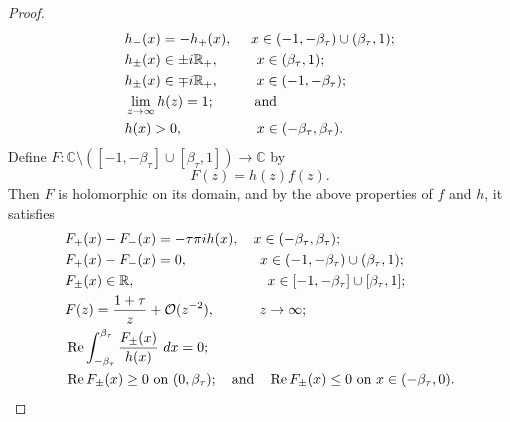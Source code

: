 \documentclass[reqno,11pt]{amsart}
\theoremstyle{plain}
\theoremstyle{definition}
\theoremstyle{remark}
\numberwithin{equation}{section}
\begin{document}
\begin{proof}
    \begin{align}
        &h_-(x)=-h_+(x),\quad\ x\in(-1,-\beta_\tau)\cup(\beta_\tau,1);\nonumber\\
        &h_\pm(x)\in \pm i\mathbb{R}_{+},\hspace{0.95cm} x\in(\beta_\tau,1);\nonumber\\
        &h_\pm(x)\in \mp i\mathbb{R}_{+},\hspace{0.95cm}  x\in(-1,-\beta_\tau);\nonumber\\
        &\lim_{z\to \infty}h(z)=1;\hspace{0.65cm}\quad \text{and}\nonumber\\
        &h(x)>0,\hspace{1.86cm} x\in(-\beta_\tau,\beta_\tau).\label{h_positive_on_(-beta,beta)}
    \end{align}
    Define $F:\mathbb{C}\setminus([-1,-\beta_\tau]\cup[\beta_\tau,1])\to\mathbb{C}$ by
    \begin{equation*}\label{F_tau>2/(pi-2)_definition}
        F(z)=h(z)f(z).
    \end{equation*}
    Then $F$ is holomorphic on its domain, and by the above properties of $f$ and $h$, it satisfies
    \begin{align}
        &F_+(x)-F_-(x)=-\tau\pi ih(x),\quad x\in(-\beta_\tau,\beta_\tau);\label{F_(1)_tau>2/(pi-2)}\\
        &F_+(x)-F_-(x)=0,\hspace{1.815cm} x\in(-1,-\beta_\tau)\cup(\beta_\tau,1);\label{F_(2)_tau>2/(pi-2)}\\
        &F_\pm(x)\in\mathbb{R},\hspace{3.33cm} x\in[-1,-\beta_\tau]\cup[\beta_\tau,1];\label{F_(2')_tau>2/(pi-2)}\\
        &F(z)=\frac{1+\tau}{z}+\mathcal O(z^{-2}),\hspace{1.12cm} z\to\infty;\label{F_(3)_tau>2/(pi-2)}\\
        &\operatorname{Re}\int_{-\beta_\tau}^{\beta_\tau} \frac{F_\pm(x)}{h(x)}\ dx=0\label{F_(4)_tau>2/(pi-2)};\\
        &\operatorname{Re}F_\pm(x)\geq0  \text{ on } (0,\beta_\tau);\quad \text{and} \quad  \operatorname{Re}F_\pm(x)\leq0 \text{ on }  x\in(-\beta_\tau,0).\label{F_(5)_tau>2/(pi-2)}
    \end{align}


\end{proof}
\end{document}
